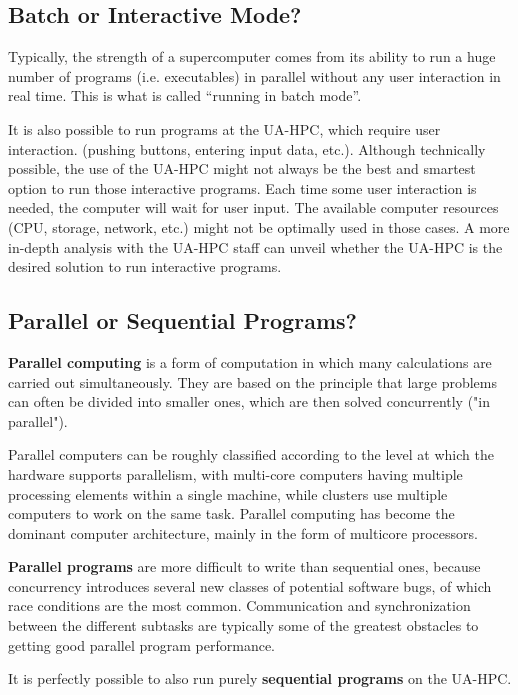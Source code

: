 \subsection{Batch or Interactive Mode?}
\label{subsec:batch-or-interactive-mode}

Typically, the strength of a supercomputer comes from its ability to run a huge
number of programs (i.e. executables) in parallel without any user interaction
in real time. This is what is called ``running in batch mode''.

It is also possible to run programs at the UA-HPC, which require user
interaction. (pushing buttons, entering input data, etc.).  Although
technically possible, the use of the UA-HPC might not always be the best and
smartest option to run those interactive programs.  Each time some user
interaction is needed, the computer will wait for user input. The available
computer resources (CPU, storage, network, etc.) might not be optimally used in
those cases. A more in-depth analysis with the UA-HPC staff can unveil whether
the UA-HPC is the desired solution to run interactive programs.

\subsection{Parallel or Sequential Programs?}
\label{subsec:parallel-or-sequential-programs}

\textbf{Parallel computing} is a form of computation in which many calculations
are carried out simultaneously. They are based on the principle that large
problems can often be divided into smaller ones, which are then solved
concurrently ("in parallel").

Parallel computers can be roughly classified according to the level at which
the hardware supports parallelism, with multi-core computers having multiple
processing elements within a single machine, while clusters use multiple
computers to work on the same task. Parallel computing has become the dominant
computer architecture, mainly in the form of multicore processors.

\textbf{Parallel programs} are more difficult to write than sequential ones,
because concurrency introduces several new classes of potential software bugs,
of which race conditions are the most common. Communication and synchronization
between the different subtasks are typically some of the greatest obstacles to
getting good parallel program performance.

It is perfectly possible to also run purely \textbf{sequential programs} on the
UA-HPC.

